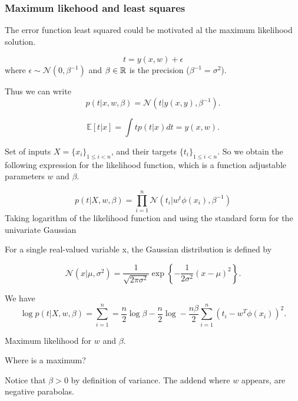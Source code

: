 \begin{frame}
  \frametitle{Maximum likehood and least squares}

  The error function least squared could be motivated
  al the maximum likelihood solution. 

  \begin{equation}
    t = y(x,w) + \epsilon 
  \end{equation}
  where $\epsilon \sim \mathcal{N}(0, \beta^{-1})$ 
  and $\beta \in \mathbb{R}$ is the precision ($\beta^{-1} = \sigma^2$). 

  Thus we can write
  \begin{equation}
    p(t | x, w, \beta) = \mathcal{N}(t | y(x,y), \beta^{-1}). 
  \end{equation}

  \begin{equation}
    \mathbb{E}[t | x] = 
    \int t p(t|x) dt
    = y(x,w).
  \end{equation}
  
\end{frame}

\begin{frame}
  Set of inputs $X = \{x_i\}_{1\leq i < n}$, and their targets $\{ t_i\}_{1\leq i < n}$. 
  So we obtain the following expression for the likelihood function, which is a function adjustable parameters $w$ and $\beta$. 

  \begin{equation}
    p (t | X, w, \beta) = 
    \prod^{n}_{i=1} 
    \mathcal{N}(t_i | w^t \phi(x_i), \beta^{-1})
  \end{equation}
  Taking logarithm of the likelihood function and using the standard form for the univariate Gaussian
\end{frame}
\begin{frame}
  For a single real-valued variable x, the Gaussian distribution is defined by

  \begin{equation}
    \mathcal{N}(x | \mu, \sigma^2) 
    = 
    \frac{1}{\sqrt{2 \pi \sigma^2}}
    \exp 
    \left\{
      - \frac{1}{2 \sigma^2} (x - \mu)^2
    \right\}. 
  \end{equation}

  We have
  \begin{equation}
    \log p(t|X,w, \beta) 
    =
    \sum^n_{i=1}
    = \frac{n}{2} \log \beta 
    - \frac{n}{2} \log  
    - \frac{n \beta}{2} 
    \sum_{i = 1}^n
    (t_i - w^T \phi(x_i))^2.
  \end{equation}

  Maximum likelihood for $w$ and $\beta$.

  Where is a maximum? 

  Notice that $\beta > 0$ by definition of variance. 
  The addend where $w$ appears,  are negative parabolas. 
\end{frame}

